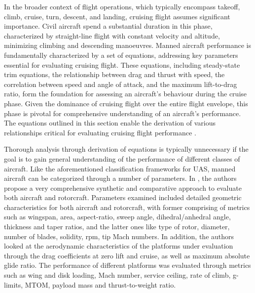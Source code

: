 \documentclass[english, 12pt, a4paper, elec, utf8, a-1b, online]{aaltothesis}
\begin{document}
In the broader context of flight operations, which typically encompass takeoff, climb, cruise, turn, descent, and landing, cruising flight assumes significant importance.
Civil aircraft spend a substantial duration in this phase, characterized by straight-line flight with constant velocity and altitude, minimizing climbing and descending manoeuvres.
Manned aircraft performance is fundamentally characterized by a set of equations, addressing key parameters essential for evaluating cruising flight.
These equations, including steady-state trim equations, the relationship between drag and thrust with speed, the correlation between speed and angle of attack, and the maximum lift-to-drag ratio, form the foundation for assessing an aircraft's behaviour during the cruise phase.
Given the dominance of cruising flight over the entire flight envelope, this phase is pivotal for comprehensive understanding of an aircraft's performance.
The equations outlined in this section enable the derivation of various relationships critical for evaluating cruising flight performance \cite{sadraey2017ch5}.

Thorough analysis through derivation of equations is typically unnecessary if the goal is to gain general understanding of the performance of different classes of aircraft.
Like the aforementioned classification frameworks for UAS, manned aircraft can be categorized through a number of parameters.
In \cite{filippone2000data}, the authors propose a very comprehensive synthetic and comparative approach to evaluate both aircraft and rotorcraft.
Parameters examined included detailed geometric characteristics for both aircraft and rotorcraft, with former comprising of metrics such as wingspan, area, aspect-ratio, sweep angle, dihedral/anhedral angle, thickness and taper ratios, and the latter ones like type of rotor, diameter, number of blades, solidity, rpm, tip Mach numbers.
In addition, the authors looked at the aerodynamic characteristics of the platforms under evaluation through the drag coefficients at zero lift and cruise, as well as maximum absolute glide ratio.
The performance of different platforms was evaluated through metrics such as wing and disk loading, Mach number, service ceiling, rate of climb, g-limits, MTOM, payload mass and thrust-to-weight ratio.
\end{document}
